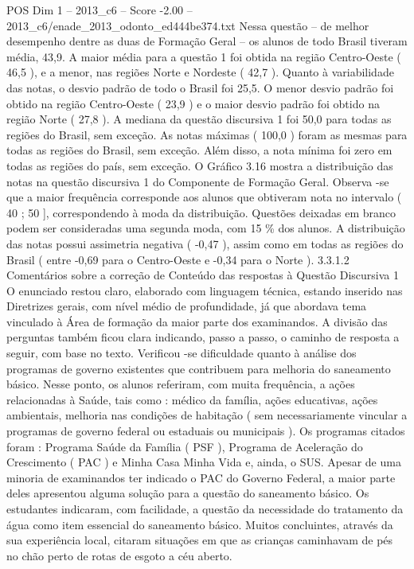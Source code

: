 \begin{textsample}{POS Dim 1 – 2013\_c6 – Score -2.00 – 2013\_c6/enade\_2013\_odonto\_ed444be374.txt}
Nessa questão – de melhor desempenho dentre as duas de Formação Geral – os alunos de todo Brasil tiveram média, 43,9.
A maior média para a questão 1 foi obtida na região Centro-Oeste ( 46,5 ), e a menor, nas regiões Norte e Nordeste ( 42,7 ).
Quanto à variabilidade das notas, o desvio padrão de todo o Brasil foi 25,5.
O menor desvio padrão foi obtido na região Centro-Oeste ( 23,9 ) e o maior desvio padrão foi obtido na região Norte ( 27,8 ).
A mediana da questão discursiva 1 foi 50,0 para todas as regiões do Brasil, sem exceção.
As notas máximas ( 100,0 ) foram as mesmas para todas as regiões do Brasil, sem exceção.
Além disso, a nota mínima foi zero em todas as regiões do país, sem exceção.
O Gráfico 3.16 mostra a distribuição das notas na questão discursiva 1 do Componente de Formação Geral.
Observa -se que a maior frequência corresponde aos alunos que obtiveram nota no intervalo ( 40 ; 50 ], correspondendo à moda da distribuição.
Questões deixadas em branco podem ser consideradas uma segunda moda, com 15 \% dos alunos.
A distribuição das notas possui assimetria negativa ( -0,47 ), assim como em todas as regiões do Brasil ( entre -0,69 para o Centro-Oeste e -0,34 para o Norte ). 3.3.1.2 Comentários sobre a correção de Conteúdo das respostas à Questão Discursiva 1 O enunciado restou claro, elaborado com linguagem técnica, estando inserido nas Diretrizes gerais, com nível médio de profundidade, já que abordava tema vinculado à Área de formação da maior parte dos examinandos.
A divisão das perguntas também ficou clara indicando, passo a passo, o caminho de resposta a seguir, com base no texto.
Verificou -se dificuldade quanto à análise dos programas de governo existentes que contribuem para melhoria do saneamento básico.
Nesse ponto, os alunos referiram, com muita frequência, a ações relacionadas à Saúde, tais como : médico da família, ações educativas, ações ambientais, melhoria nas condições de habitação ( sem necessariamente vincular a programas de governo federal ou estaduais ou municipais ).
Os programas citados foram : Programa Saúde da Família ( PSF ), Programa de Aceleração do Crescimento ( PAC ) e Minha Casa Minha Vida e, ainda, o SUS.
Apesar de uma minoria de examinandos ter indicado o PAC do Governo Federal, a maior parte deles apresentou alguma solução para a questão do saneamento básico.
Os estudantes indicaram, com facilidade, a questão da necessidade do tratamento da água como item essencial do saneamento básico.
Muitos concluintes, através da sua experiência local, citaram situações em que as crianças caminhavam de pés no chão perto de rotas de esgoto a céu aberto.

\end{textsample}
